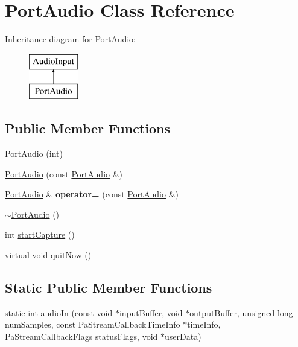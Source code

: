 \hypertarget{classPortAudio}{}\section{Port\+Audio Class Reference}
\label{classPortAudio}
Inheritance diagram for Port\+Audio\+:\begin{figure}[H]
\begin{center}
\leavevmode
\includegraphics[height=2.000000cm]{classPortAudio}
\end{center}
\end{figure}
\subsection*{Public Member Functions}
\begin{DoxyCompactItemize}
\item 
\mbox{\hyperlink{classPortAudio_ae2b322ab89b7412a1bc61a4b02a20bf0}{Port\+Audio}} (int)
\item 
\mbox{\hyperlink{classPortAudio_a5f84a7247f216657c54993180fc18c6c}{Port\+Audio}} (const \mbox{\hyperlink{classPortAudio}{Port\+Audio}} \&)
\item 
\mbox{\label{classPortAudio_aacb93627b1b3aa427cd3f357b7e20eb7}} 
\mbox{\hyperlink{classPortAudio}{Port\+Audio}} \& {\bfseries operator=} (const \mbox{\hyperlink{classPortAudio}{Port\+Audio}} \&)
\item 
\mbox{\hyperlink{classPortAudio_a5f80fdff2377981fcd42fae42d4b65c3}{$\sim$\+Port\+Audio}} ()
\item 
int \mbox{\hyperlink{classPortAudio_a2685650c8e1568f8089babd3af5f6bc1}{start\+Capture}} ()
\item 
virtual void \mbox{\hyperlink{classPortAudio_a88fc85aad0b14014b0775ec0a769ea0a}{quit\+Now}} ()
\end{DoxyCompactItemize}
\subsection*{Static Public Member Functions}
\begin{DoxyCompactItemize}
\item 
static int \mbox{\hyperlink{classPortAudio_a006e388f2b3e886377390e1a97580d53}{audio\+In}} (const void $\ast$input\+Buffer, void $\ast$output\+Buffer, unsigned long num\+Samples, const Pa\+Stream\+Callback\+Time\+Info $\ast$time\+Info, Pa\+Stream\+Callback\+Flags status\+Flags, void $\ast$user\+Data)
\end{DoxyCompactItemize}
